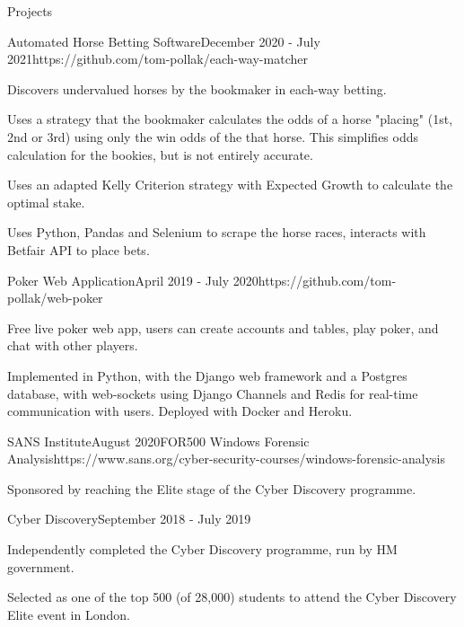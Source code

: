 \documentclass{structure}
\begin{document}
\begin{rSection}{Projects}

    \begin{rSubsection}{Automated Horse Betting Software}{December 2020 - July 2021}{}{}{https://github.com/tom-pollak/each-way-matcher}
        \item Discovers undervalued horses by the bookmaker in each-way betting.
        \item Uses a strategy that the bookmaker calculates the odds of a horse
        "placing" (1st, 2nd or 3rd) using only the win odds of the that horse. This simplifies
        odds calculation for the bookies, but is not entirely accurate.
        \item Uses an adapted Kelly Criterion strategy with Expected Growth to calculate
        the optimal stake.
        \item Uses Python, Pandas and Selenium to scrape the horse races, interacts with
        Betfair API to place bets.
    \end{rSubsection}

    \begin{rSubsection}{Poker Web Application}{April 2019 - July 2020}{}{}{https://github.com/tom-pollak/web-poker}
        \item Free live poker web app, users can create accounts and tables, play poker, and chat with other players.
        \item Implemented in Python, with the Django web framework and a Postgres database,
        with web-sockets using Django Channels and Redis for real-time communication with users.
        Deployed with Docker and Heroku.
    \end{rSubsection}

    \begin{rSubsection}{SANS Institute}{August 2020}{FOR500 Windows Forensic Analysis}{}{https://www.sans.org/cyber-security-courses/windows-forensic-analysis}
        \item Sponsored by reaching the Elite stage of the Cyber Discovery programme.
    \end{rSubsection}

    \begin{rSubsection}{Cyber Discovery}{September 2018 - July 2019}{}{}{}
        \item Independently completed the Cyber Discovery programme, run by HM government.
        \item Selected as one of the top 500 (of 28,000) students to attend the Cyber Discovery Elite event in London.
    \end{rSubsection}

\end{rSection}
\end{document}

